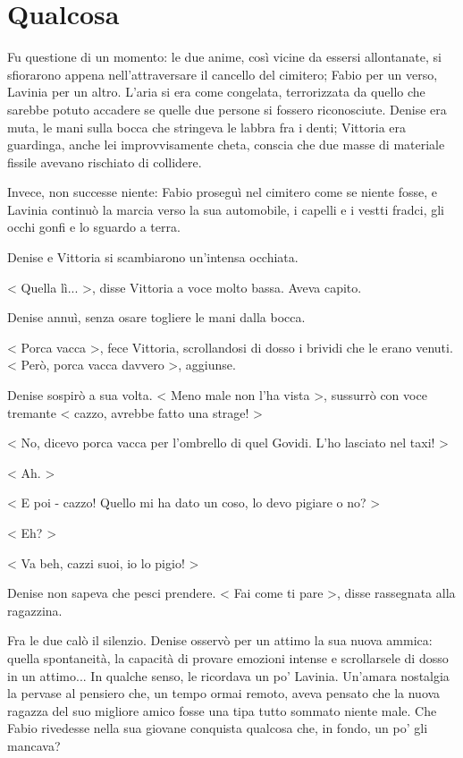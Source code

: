 \chapter{Qualcosa}

Fu questione di un momento: le due anime, così vicine da essersi allontanate, si sfiorarono appena nell'attraversare il cancello del cimitero; Fabio per un verso, Lavinia per un altro. L'aria si era come congelata, terrorizzata da quello che sarebbe potuto accadere se quelle due persone si fossero riconosciute. Denise era muta, le mani sulla bocca che stringeva le labbra fra i denti; Vittoria era guardinga, anche lei improvvisamente cheta, conscia che due masse di materiale fissile avevano rischiato di collidere.

Invece, non successe niente: Fabio proseguì nel cimitero come se niente fosse, e Lavinia continuò la marcia verso la sua automobile, i capelli e i vestti fradci, gli occhi gonfi e lo sguardo a terra.

Denise e Vittoria si scambiarono un'intensa occhiata.

< Quella lì... >, disse Vittoria a voce molto bassa. Aveva capito.

Denise annuì, senza osare togliere le mani dalla bocca.

< Porca vacca >, fece Vittoria, scrollandosi di dosso i brividi che le erano venuti. < Però, porca vacca davvero >, aggiunse.

Denise sospirò a sua volta. < Meno male non l'ha vista >, sussurrò con voce tremante < cazzo, avrebbe fatto una strage! >

< No, dicevo porca vacca per l'ombrello di quel Govidi. L'ho lasciato nel taxi! >

< Ah. >

< E poi - cazzo! Quello mi ha dato un coso, lo devo pigiare o no? > 

< Eh? >

< Va beh, cazzi suoi, io lo pigio! >

Denise non sapeva che pesci prendere. < Fai come ti pare >, disse rassegnata alla ragazzina.

Fra le due calò il silenzio. Denise osservò per un attimo la sua nuova ammica: quella spontaneità, la capacità di provare emozioni intense e scrollarsele di dosso in un attimo... In qualche senso, le ricordava un po' Lavinia. Un'amara nostalgia la pervase al pensiero che, un tempo ormai remoto, aveva pensato che la nuova ragazza del suo migliore amico fosse una tipa tutto sommato niente male. Che Fabio rivedesse nella sua giovane conquista qualcosa che, in fondo, un po' gli mancava?

